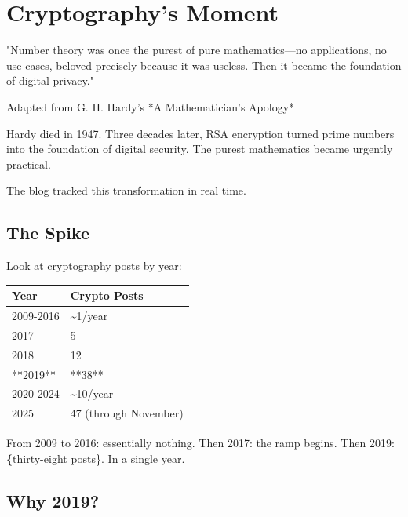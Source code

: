 \chapter{Cryptography's Moment}

\epigraph{"Number theory was once the purest of pure mathematics—no applications, no use cases, beloved precisely because it was useless. Then it became the foundation of digital privacy."}{Adapted from G. H. Hardy's *A Mathematician's Apology*}

\bigskip

Hardy died in 1947. Three decades later, RSA encryption turned prime numbers into the foundation of digital security. The purest mathematics became urgently practical.

The blog tracked this transformation in real time.

\bigskip

\section*{The Spike}

Look at cryptography posts by year:

\begin{center}
\begin{tabular}{ll}
\toprule
\textbf{Year} & \textbf{Crypto Posts} \\
\midrule
2009-2016 & \textasciitilde{}1/year \\
2017 & 5 \\
2018 & 12 \\
**2019** & **38** \\
2020-2024 & \textasciitilde{}10/year \\
2025 & 47 (through November) \\
\bottomrule
\end{tabular}
\end{center}

From 2009 to 2016: essentially nothing.
Then 2017: the ramp begins.
Then 2019: \textbf\{thirty-eight posts\}. In a single year.



\bigskip

\section*{Why 2019?}

